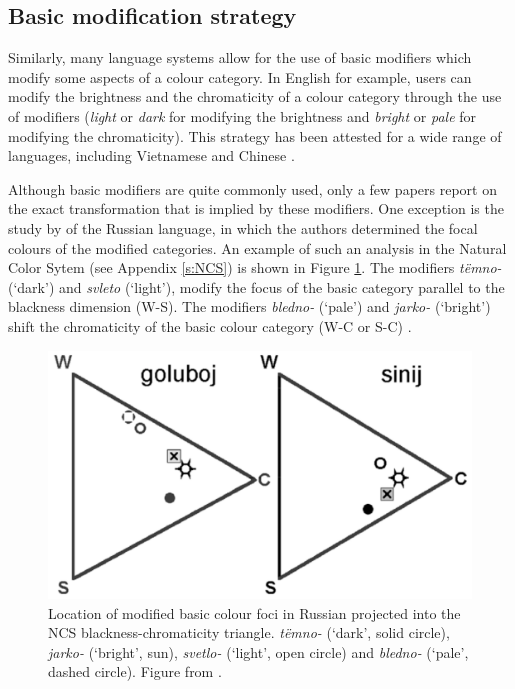 \subsection{Basic modification strategy}

Similarly, many language systems allow for the use of basic
modifiers which modify some aspects of a colour category. In English
for example, users can modify the brightness and the chromaticity of a
colour category through the use of modifiers (\textit{light} or \textit{dark}
for modifying the brightness and \textit{bright} or \textit{pale} for modifying
the chromaticity). This strategy has been attested for a wide range of
languages, including Vietnamese \citep{alvarado02modifying} and
Chinese \citep{lin01unconstrained}.

Although basic modifiers are quite commonly used, only a few
papers report on the exact transformation that is implied by these
modifiers. One exception is the study by \cite{safuanova07russian} of
the Russian language, in which the authors determined the focal
colours of the modified categories. An example of such an analysis in
the Natural Color Sytem (see Appendix \ref{s:NCS}) is shown in Figure
\ref{f:intro-russian-modifiers}. The modifiers \textit{t\"emno-} (`dark') and
\textit{svleto} (`light'), modify the focus of the basic category parallel to
the blackness dimension (W-S). The modifiers \textit{bledno-} (`pale') and
\textit{jarko-} (`bright') shift the chromaticity of the basic colour
category (W-C or S-C) \citep{safuanova07russian}.

\begin{figure}[htpb]
  \centering
  \includegraphics[width=.5\textwidth]{./intro/figures/russian-diagram.pdf}
  \caption[Location of modified basic colour foci in Russian]{Location
    of modified basic colour foci in Russian projected into the NCS
    blackness-chromaticity triangle. \textit{t\"emno-} (`dark', solid
    circle), \textit{jarko-} (`bright', sun), \textit{svetlo-} (`light', open circle) and  \textit{bledno-} (`pale', dashed circle). Figure
    from \cite{paramei05singing}.}
  \label{f:intro-russian-modifiers}
\end{figure}

